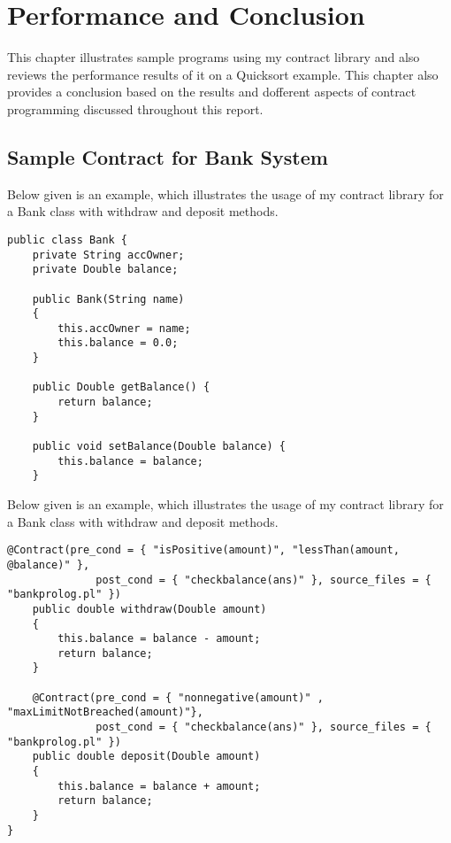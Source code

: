 \chapter{Performance and Conclusion}

This chapter illustrates sample programs using my contract library and also reviews the performance results of it on a Quicksort example. This chapter also provides a conclusion based on the results and dofferent aspects of contract programming discussed throughout this report.

\section{Sample Contract for Bank System}


\begin{minipage}{\linewidth}
Below given is an example, which illustrates the usage of my contract library for a Bank class with withdraw and deposit methods.
\lstset{language=Java, caption=Java Contracts for Bank class, captionpos=b, breaklines=true, showstringspaces=false}       
\begin{lstlisting}[frame=single]
public class Bank {
	private String accOwner;
	private Double balance;
	
	public Bank(String name)
	{
		this.accOwner = name;
		this.balance = 0.0;
	}
	
	public Double getBalance() {
		return balance;
	}

	public void setBalance(Double balance) {
		this.balance = balance;
	}

\end{lstlisting}
\end{minipage}

\begin{minipage}{\linewidth}
Below given is an example, which illustrates the usage of my contract library for a Bank class with withdraw and deposit methods.
\lstset{language=Java, caption=Java Contracts for Bank class, captionpos=b, breaklines=true, showstringspaces=false}       
\begin{lstlisting}[frame=single]
	@Contract(pre_cond = { "isPositive(amount)", "lessThan(amount, @balance)" }, 
			  post_cond = { "checkbalance(ans)" }, source_files = { "bankprolog.pl" })
	public double withdraw(Double amount)
	{
		this.balance = balance - amount;
		return balance;
	}
	
	@Contract(pre_cond = { "nonnegative(amount)" , "maxLimitNotBreached(amount)"}, 
			  post_cond = { "checkbalance(ans)" }, source_files = { "bankprolog.pl" })
	public double deposit(Double amount)
	{
		this.balance = balance + amount;
		return balance;
	}
}


\end{lstlisting}
\end{minipage}
 

